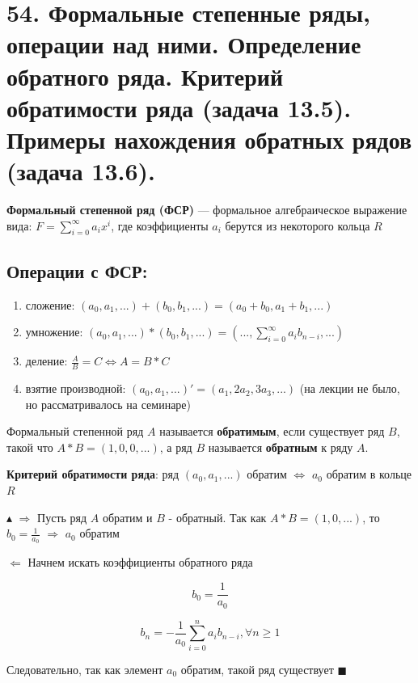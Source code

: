 \section*{54. Формальные степенные ряды, операции над ними. Определение обратного ряда. Критерий обратимости ряда (задача 13.5). Примеры нахождения обратных рядов (задача 13.6).}
\textbf{Формальный степенной ряд (ФСР)} — формальное алгебраическое выражение вида: $F=\sum_{i=0}^{\infty} a_{i}x^i$, где коэффициенты $a_i$ берутся из некоторого кольца $R$

\subsection*{Операции с ФСР:}
\begin{enumerate}
    \item сложение: $(a_0, a_1, ...)+(b_0, b_1, ...)=(a_0+b_0, a_1+b_1, ...)$
    \item умножение: \((a_0, a_1, ...)*(b_0, b_1, ...)=(..., \sum_{i=0}^{\infty} a_i b_{n-i}, ...)\)
    \item деление: $\frac{A}{B} = C \Leftrightarrow A=B*C$
    \item взятие производной: $(a_0, a_1, ...)'=(a_1, 2a_2, 3a_3, ...)$ (на лекции не было, но рассматривалось на семинаре)
\end{enumerate}

Формальный степенной ряд $A$ называется \textbf{обратимым}, если существует ряд $B$, такой что $A*B=(1, 0, 0, ...)$, а ряд $B$ называется \textbf{обратным} к ряду $A$.

\textbf{Критерий обратимости ряда}: ряд $(a_0, a_1, ...)$ обратим $\Leftrightarrow$  $a_0$ обратим в кольце $R$

$\blacktriangle$ $\Rightarrow$ Пусть ряд $A$ обратим и $B$ - обратный. Так как $A*B=(1, 0, ...)$, то $b_0 = \frac{1}{a_0}$ $\Rightarrow$ $a_0$ обратим

$\Leftarrow$ Начнем искать коэффициенты обратного ряда

\[b_0 = \frac{1}{a_0}\]

\[b_n = -\frac{1}{a_0} \sum_{i=0}^{n} a_i b_{n-i}, \forall n \geq 1\]

Следовательно, так как элемент $a_0$ обратим, такой ряд существует $\blacksquare$
